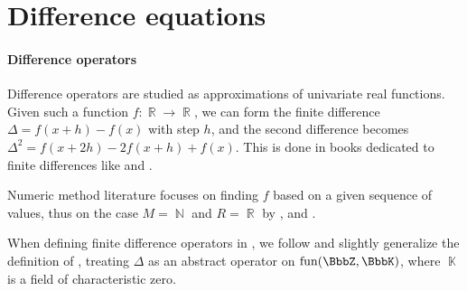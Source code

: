 \section{Difference equations}\label{sec:difference_equations}

\paragraph{Difference operators}

\begin{remark}\label{rem:finite_difference_literature}
  Difference operators are studied as approximations of univariate real functions. Given such a function \( f: \BbbR \to \BbbR \), we can form the finite difference \( \Delta = f(x + h) - f(x) \) with step \( h \), and the second difference becomes \( \Delta^2 = f(x + 2h) - 2f(x + h) + f(x) \). This is done in books dedicated to finite differences like  and .

  Numeric method literature focuses on finding \( f \) based on a given sequence of values, thus on the case \( M = \BbbN \) and \( R = \BbbR \) by ,  and .

  When defining finite difference operators in , we follow and slightly generalize the definition of , treating \( \Delta \) as an abstract operator on \( \fun(\BbbZ, \BbbK) \), where \( \BbbK \) is a field of characteristic zero.
\end{remark}

